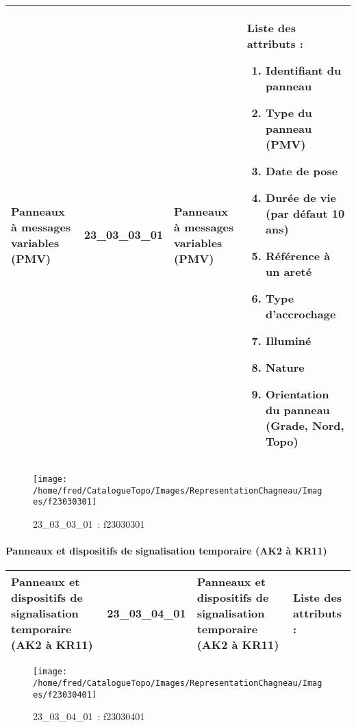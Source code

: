 \documentclass[12pt,titlepage]{book}
\begin{document}
\renewcommand{\arraystretch}{1.2}
\begin{supertabular}{|p{10cm}|c|p{13cm}|p{12cm}|}
 Panneaux à messages variables (PMV) & 23\_03\_03\_01 & Panneaux à messages variables (PMV) & Liste des attributs :
\begin{enumerate}
  \item Identifiant du panneau  \item Type du panneau (PMV)  \item Date de pose  \item Durée de vie (par défaut 10 ans)  \item Référence à un areté  \item Type d'accrochage  \item Illuminé  \item Nature  \item Orientation du panneau (Grade, Nord, Topo)\end{enumerate}
\\
\hline
\end{supertabular}
\begin{figure}[h!]
  \hfill         %
  \begin{minipage}[t]{3cm}
    \begin{center}
      \texttt{[image: /home/fred/CatalogueTopo/Images/RepresentationChagneau/Images/f23030301]}
      \caption[~23\_03\_03\_01]{\small{23\_03\_03\_01~:} \tiny{f23030301}}\label{f23030301}
    \end{center}
  \end{minipage}
\end{figure}


\paragraph{Panneaux et dispositifs de signalisation temporaire (AK2 à KR11)}
\noindent
\vspace{\baselineskip}

\renewcommand{\arraystretch}{1.2}
\begin{supertabular}{|p{10cm}|c|p{13cm}|p{12cm}|}
 Panneaux et dispositifs de signalisation temporaire (AK2 à KR11) & 23\_03\_04\_01 & Panneaux et dispositifs de signalisation temporaire (AK2 à KR11) & Liste des attributs :
\begin{enumerate}
\end{enumerate}
\\
\hline
\end{supertabular}
\begin{figure}[h!]
  \hfill         %
  \begin{minipage}[t]{3cm}
    \begin{center}
      \texttt{[image: /home/fred/CatalogueTopo/Images/RepresentationChagneau/Images/f23030401]}
      \caption[~23\_03\_04\_01]{\small{23\_03\_04\_01~:} \tiny{f23030401}}\label{f23030401}
    \end{center}
  \end{minipage}
\end{figure}
\end{document}
